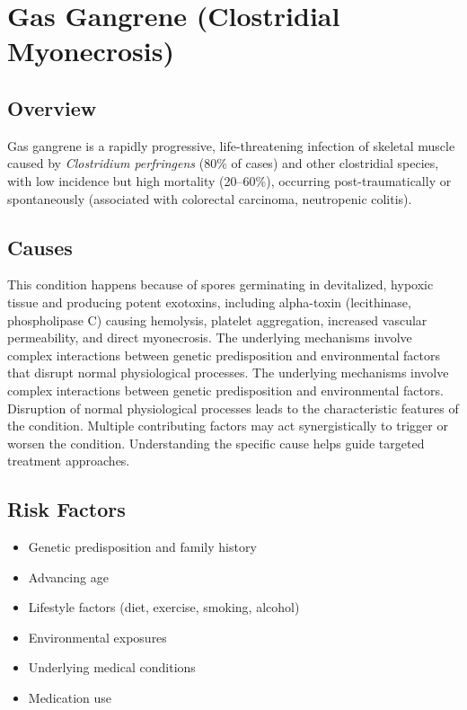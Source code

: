 \chapter{Gas Gangrene (Clostridial Myonecrosis)}
\label{sec:Gas Gangrene}

\section{Overview}
Gas gangrene is a rapidly progressive, life-threatening infection of skeletal muscle caused by \textit{Clostridium perfringens} (80\% of cases) and other clostridial species, with low incidence but high mortality (20--60\%), occurring post-traumatically or spontaneously (associated with colorectal carcinoma, neutropenic colitis).
\section{Causes}
This condition happens because of spores germinating in devitalized, hypoxic tissue and producing potent exotoxins, including alpha-toxin (lecithinase, phospholipase C) causing hemolysis, platelet aggregation, increased vascular permeability, and direct myonecrosis. The underlying mechanisms involve complex interactions between genetic predisposition and environmental factors that disrupt normal physiological processes. The underlying mechanisms involve complex interactions between genetic predisposition and environmental factors. Disruption of normal physiological processes leads to the characteristic features of the condition. Multiple contributing factors may act synergistically to trigger or worsen the condition. Understanding the specific cause helps guide targeted treatment approaches.
\section{Risk Factors}


\begin{itemize}[noitemsep]
  \item Genetic predisposition and family history
  \item Advancing age
  \item Lifestyle factors (diet, exercise, smoking, alcohol)
  \item Environmental exposures
  \item Underlying medical conditions
  \item Medication use
\end{itemize}
